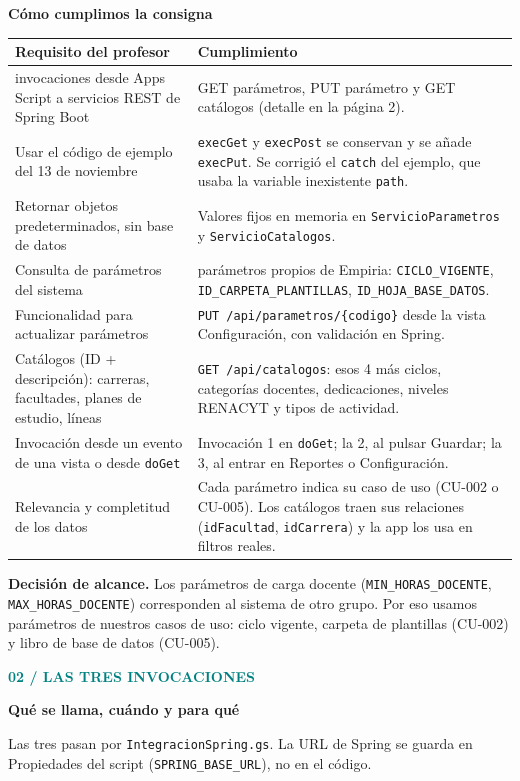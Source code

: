 \documentclass[11pt,a4paper]{article}
\newcommand{\titulo}[3]{\textcolor{teal}{\small\textbf{#1}}\par{\LARGE\bfseries #2}\par\vspace{2mm}#3\par\vspace{3mm}}
\newcommand{\nota}[2]{\begin{tcolorbox}[colback=amber!8!white,colframe=amber!40!white,boxrule=0.5pt,arc=2mm,before upper=\raggedright]\textcolor{amber}{\textbf{#1}} #2\end{tcolorbox}}
\newcommand{\cod}[1]{\texttt{#1}}
\begin{document}
\textbf{Cómo cumplimos la consigna}\par
\renewcommand{\arraystretch}{1.35}
\begin{tabularx}{\textwidth}{>{\raggedright\arraybackslash}p{58mm} >{\raggedright\arraybackslash}X}
\hline
\textbf{Requisito del profesor} & \textbf{Cumplimiento} \\ \hline
3 invocaciones desde Apps Script a servicios REST de Spring Boot & GET parámetros, PUT parámetro y GET catálogos (detalle en la página 2). \\
Usar el código de ejemplo del 13 de noviembre & \cod{execGet} y \cod{execPost} se conservan y se añade \cod{execPut}. Se corrigió el \cod{catch} del ejemplo, que usaba la variable inexistente \cod{path}. \\
Retornar objetos predeterminados, sin base de datos & Valores fijos en memoria en \cod{ServicioParametros} y \cod{ServicioCatalogos}. \\
Consulta de parámetros del sistema & 3 parámetros propios de Empiria: \cod{CICLO\_VIGENTE}, \cod{ID\_CARPETA\_PLANTILLAS}, \cod{ID\_HOJA\_BASE\_DATOS}. \\
Funcionalidad para actualizar parámetros & \cod{PUT /api/parametros/\{codigo\}} desde la vista Configuración, con validación en Spring. \\
Catálogos (ID + descripción): carreras, facultades, planes de estudio, líneas & \cod{GET /api/catalogos}: esos 4 más ciclos, categorías docentes, dedicaciones, niveles RENACYT y tipos de actividad. \\
Invocación desde un evento de una vista o desde \cod{doGet} & Invocación 1 en \cod{doGet}; la 2, al pulsar Guardar; la 3, al entrar en Reportes o Configuración. \\
Relevancia y completitud de los datos & Cada parámetro indica su caso de uso (CU-002 o CU-005). Los catálogos traen sus relaciones (\cod{idFacultad}, \cod{idCarrera}) y la app los usa en filtros reales. \\ \hline
\end{tabularx}

\nota{Decisión de alcance.}{Los parámetros de carga docente (\cod{MIN\_HORAS\_DOCENTE}, \cod{MAX\_HORAS\_DOCENTE}) corresponden al sistema de otro grupo. Por eso usamos parámetros de nuestros casos de uso: ciclo vigente, carpeta de plantillas (CU-002) y libro de base de datos (CU-005).}
\newpage

\titulo{02 / LAS TRES INVOCACIONES}{Qué se llama, cuándo y para qué}{Las tres pasan por \cod{IntegracionSpring.gs}. La URL de Spring se guarda en Propiedades del script (\cod{SPRING\_BASE\_URL}), no en el código.}
\end{document}
